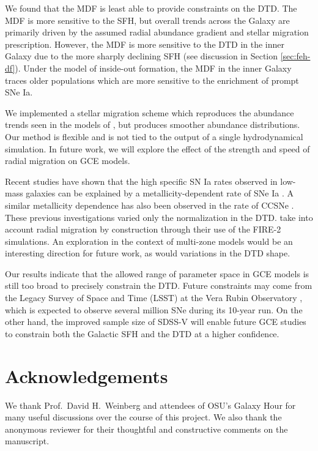 \documentclass[twocolumn,twocolappendix]{aastex631}
\begin{document}
We found that the MDF is least able to provide constraints on the DTD. The MDF is more sensitive to the SFH, but overall trends across the Galaxy are primarily driven by the assumed radial abundance gradient and stellar migration prescription. However, the MDF is more sensitive to the DTD in the inner Galaxy due to the more sharply declining SFH (see discussion in Section \ref{sec:feh-df}). Under the model of inside-out formation, the MDF in the inner Galaxy traces older populations which are more sensitive to the enrichment of prompt SNe Ia.

We implemented a stellar migration scheme which reproduces the abundance trends seen in the models of , but produces smoother abundance distributions. Our method is flexible and is not tied to the output of a single hydrodynamical simulation. In future work, we will explore the effect of the strength and speed of radial migration on GCE models.

Recent studies have shown that the high specific SN Ia rates observed in low-mass galaxies \citep[e.g.,][]{Brown2019-ASASSNrates,Wiseman2021-DESRates} can be explained by a metallicity-dependent rate of SNe Ia \citep{Gandhi2022-MetallicityDependentRates,Johnson2023-Binaries}. A similar metallicity dependence has also been observed in the rate of CCSNe \citep{Pessi2023-MetalDepCCSNe}. These previous investigations varied only the normalization in the DTD. \citet{Gandhi2022-MetallicityDependentRates} take into account radial migration by construction through their use of the FIRE-2 simulations. An exploration in the context of multi-zone models would be an interesting direction for future work, as would variations in the DTD shape.

Our results indicate that the allowed range of parameter space in GCE models is still too broad to precisely constrain the DTD. Future constraints may come from the Legacy Survey of Space and Time (LSST) at the Vera Rubin Observatory \citep{Ivezic2019-LSST}, which is expected to observe several million SNe during its 10-year run. On the other hand,
the improved sample size of SDSS-V \citep{Kollmeier2017-SDSS-V} will enable future GCE studies to constrain both the Galactic SFH and the DTD at a higher confidence.

\section*{Acknowledgements}

We thank Prof.\ David H.\ Weinberg and attendees of OSU's Galaxy Hour for many useful discussions over the course of this project. We also thank the anonymous reviewer for their thoughtful and constructive comments on the manuscript.
\end{document}
